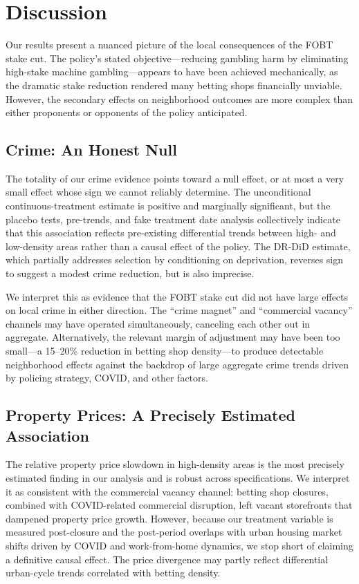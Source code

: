 \documentclass[12pt]{article}
\begin{document}
\section{Discussion}
\label{sec:discussion}

Our results present a nuanced picture of the local consequences of the FOBT stake cut. The policy's stated objective---reducing gambling harm by eliminating high-stake machine gambling---appears to have been achieved mechanically, as the dramatic stake reduction rendered many betting shops financially unviable. However, the secondary effects on neighborhood outcomes are more complex than either proponents or opponents of the policy anticipated.

\subsection{Crime: An Honest Null}

The totality of our crime evidence points toward a null effect, or at most a very small effect whose sign we cannot reliably determine. The unconditional continuous-treatment estimate is positive and marginally significant, but the placebo tests, pre-trends, and fake treatment date analysis collectively indicate that this association reflects pre-existing differential trends between high- and low-density areas rather than a causal effect of the policy. The DR-DiD estimate, which partially addresses selection by conditioning on deprivation, reverses sign to suggest a modest crime reduction, but is also imprecise.

We interpret this as evidence that the FOBT stake cut did not have large effects on local crime in either direction. The ``crime magnet'' and ``commercial vacancy'' channels may have operated simultaneously, canceling each other out in aggregate. Alternatively, the relevant margin of adjustment may have been too small---a 15--20\% reduction in betting shop density---to produce detectable neighborhood effects against the backdrop of large aggregate crime trends driven by policing strategy, COVID, and other factors.

\subsection{Property Prices: A Precisely Estimated Association}

The relative property price slowdown in high-density areas is the most precisely estimated finding in our analysis and is robust across specifications. We interpret it as consistent with the commercial vacancy channel: betting shop closures, combined with COVID-related commercial disruption, left vacant storefronts that dampened property price growth. However, because our treatment variable is measured post-closure and the post-period overlaps with urban housing market shifts driven by COVID and work-from-home dynamics, we stop short of claiming a definitive causal effect. The price divergence may partly reflect differential urban-cycle trends correlated with betting density.
\end{document}
